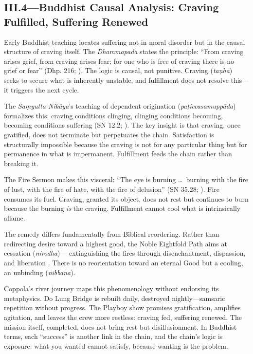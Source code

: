 \subsection*{III.4—Buddhist Causal Analysis: Craving Fulfilled, Suffering Renewed}
\label{ssec:iii-buddhist-causal-analysis}

Early Buddhist teaching locates suffering not in moral disorder but in the causal structure of
craving itself. The \emph{Dhammapada} states the principle: ``From craving arises grief, from
craving arises fear; for one who is free of craving there is no grief or fear'' (Dhp. 216;
\parencite{BuddharakkhitaDhp1993}). The logic is causal, not punitive. Craving (\emph{taṇhā})
seeks to secure what is inherently unstable, and fulfillment does not resolve this---it
triggers the next cycle.

The \emph{Saṃyutta Nikāya}'s teaching of dependent origination
(\emph{paṭiccasamuppāda}) formalizes this: craving conditions clinging, clinging conditions
becoming, becoming conditions suffering (SN 12.2; \parencite[p.~536]{BodhiSN2000}). The key
insight is that craving, once gratified, does not terminate
but perpetuates the chain. Satisfaction is structurally impossible because the craving is not
for any particular thing but for permanence in what is impermanent. Fulfillment feeds the
chain rather than breaking it.

The Fire Sermon makes this visceral: ``The eye is burning \ldots\ burning with the fire of
lust, with the fire of hate, with the fire of delusion'' (SN 35.28;
\parencite[p.~1143]{BodhiSN2000}). Fire consumes its fuel. Craving, granted its object, does
not rest but continues to burn because the burning \emph{is} the craving. Fulfillment cannot
cool what is intrinsically aflame.

The remedy differs fundamentally from Biblical reordering. Rather than redirecting desire
toward a highest good, the Noble Eightfold Path aims at cessation (\emph{nirodha})---
extinguishing the fires through disenchantment, dispassion, and liberation
\parencite[pp.~45--50]{Rahula1959}. There is no reorientation toward an eternal Good but a
cooling, an unbinding (\emph{nibbāna}).

Coppola's river journey maps this phenomenology without endorsing its metaphysics. Do Lung
Bridge is rebuilt daily, destroyed nightly---samsaric repetition without progress. The Playboy
show promises gratification, amplifies agitation, and leaves the crew more restless: craving
fed, suffering renewed. The mission itself, completed, does not bring rest but disillusionment.
In Buddhist terms, each ``success'' is another link in the chain, and the chain's logic is
exposure: what you wanted cannot satisfy, because wanting is the problem.
